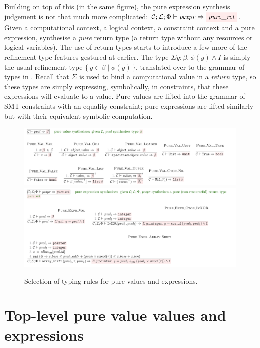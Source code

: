 Building on top of this (in the same figure), the pure expression synthesis judgement
is not that much more complicated: $\mathcal{C}; \mathcal{L}; \Phi
\vdash \mathit{pexpr} \Rightarrow \outpol{pure\_ret}$. Given a computational
context, a logical context, a constraint context and a pure expression,
synthesise a \emph{pure} return type (a return type without any resources or
logical variables). The use of return types starts to introduce a few more of
the refinement type features gestured at earlier. The type $\Sigma y {:}
\beta.\ \phi(y) \wedge{} I$ is simply the usual refinement type $\{ \, y \in
\beta \mid\phi(y) \, \}$, translated over to the grammar of types in . Recall that $\Sigma$ is used to bind a computational value in a
\emph{return} type, so these types are simply expressing, symbolically, in
constraints, that these expressions will evaluate to a value. Pure values are
lifted into the grammar of SMT constraints with an equality constraint;
pure expressions are lifted similarly but with their equivalent symbolic
computation.

\begin{figure}[tp]
    \includegraphics{figures/kernel-pval-typing}
    \includegraphics{figures/kernel-pexpr-typing}
    \caption{Selection of  typing rules for pure values and
        expressions.}\label{fig:typing-pval-pexpr}
\end{figure}

\section{Top-level pure value values and expressions}

